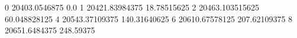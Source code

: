 0 20403.0546875 0.0
1 20421.83984375 18.78515625
2 20463.103515625 60.048828125
4 20543.37109375 140.31640625
6 20610.67578125 207.62109375
8 20651.6484375 248.59375
